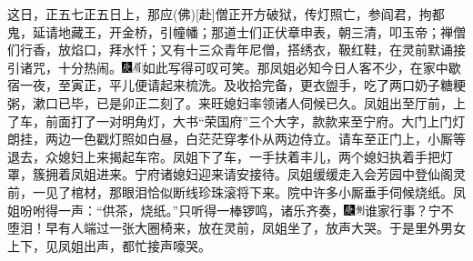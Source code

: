 这日，正五七正五日上，那应{{(佛)}}{[}赴{]}僧正开方破狱，传灯照亡，参阎君，拘都鬼，延请地藏王，开金桥，引幢幡；那道士们正伏章申表，朝三清，叩玉帝；禅僧们行香，放焰口，拜水忏；又有十三众青年尼僧，搭绣衣，靸红鞋，在灵前默诵接引诸咒，十分热闹。{\includegraphics[width=3mm]{../Images/00004}\includegraphics[width=3mm]{../Images/00010}\footnotesize \kaishu 如此写得可叹可笑。}那凤姐必知今日人客不少，在家中歇宿一夜，至寅正，平儿便请起来梳洗。及收拾完备，更衣盥手，吃了两口奶子糖粳粥，漱口已毕，已是卯正二刻了。来旺媳妇率领诸人伺候已久。凤姐出至厅前，上了车，前面打了一对明角灯，大书“荣国府”三个大字，款款来至宁府。大门上门灯朗挂，两边一色戳灯照如白昼，白茫茫穿孝仆从两边侍立。请车至正门上，小厮等退去，众媳妇上来揭起车帘。凤姐下了车，一手扶着丰儿，两个媳妇执着手把灯罩，簇拥着凤姐进来。宁府诸媳妇迎来请安接待。凤姐缓缓走入会芳园中登仙阁灵前，一见了棺材，那眼泪恰似断线珍珠滚将下来。院中许多小厮垂手伺候烧纸。凤姐吩咐得一声：“供茶，烧纸。”只听得一棒锣鸣，诸乐齐奏，{\includegraphics[width=3mm]{../Images/00004}\includegraphics[width=3mm]{../Images/00011}\footnotesize \kaishu 谁家行事？宁不堕泪！}早有人端过一张大圈椅来，放在灵前，凤姐坐了，放声大哭。于是里外男女上下，见凤姐出声，都忙接声嚎哭。

